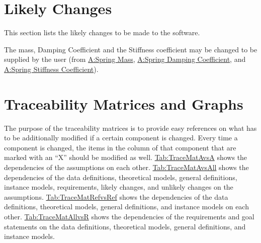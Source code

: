 \documentclass[12pt]{article}
\begin{document}
\section{Likely Changes}
\label{Sec:LCs}
This section lists the likely changes to be made to the software.

\begin{description}[font=\normalfont]
\item[DC Gain and Time Constant:\phantomsection\label{likeChgPP}]{The mass, Damping Coefficient and the Stiffness coefficient may be changed to be supplied by the user (from \hyperref[massSpring]{A:Spring Mass}, \hyperref[dampingCoeffSpring]{A:Spring Damping Coefficient}, and \hyperref[stiffnessCoeffSpring]{A:Spring Stiffness Coefficient}).}
\end{description}
\section{Traceability Matrices and Graphs}
\label{Sec:TraceMatrices}
The purpose of the traceability matrices is to provide easy references on what has to be additionally modified if a certain component is changed. Every time a component is changed, the items in the column of that component that are marked with an ``X'' should be modified as well. \hyperref[Table:TraceMatAvsA]{Tab:TraceMatAvsA} shows the dependencies of the assumptions on each other. \hyperref[Table:TraceMatAvsAll]{Tab:TraceMatAvsAll} shows the dependencies of the data definitions, theoretical models, general definitions, instance models, requirements, likely changes, and unlikely changes on the assumptions. \hyperref[Table:TraceMatRefvsRef]{Tab:TraceMatRefvsRef} shows the dependencies of the data definitions, theoretical models, general definitions, and instance models on each other. \hyperref[Table:TraceMatAllvsR]{Tab:TraceMatAllvsR} shows the dependencies of the requirements and goal statements on the data definitions, theoretical models, general definitions, and instance models.
\end{document}
